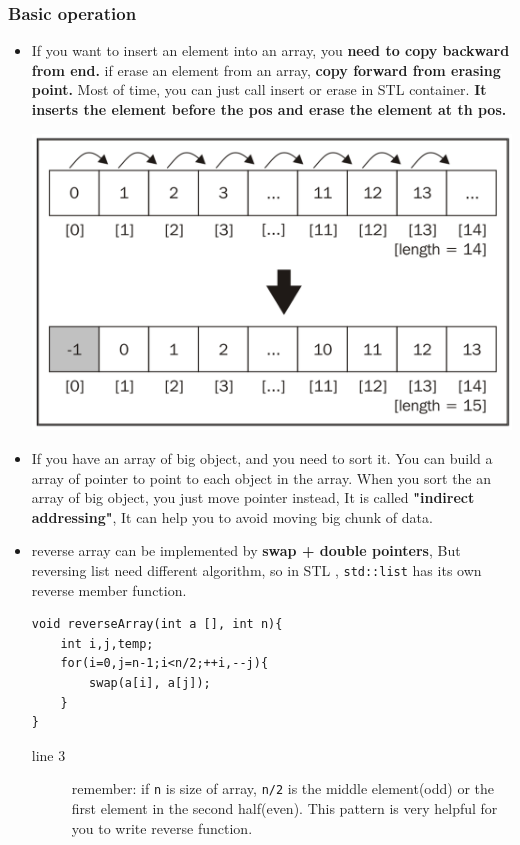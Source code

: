 \documentclass[a4paper,11pt,twoside]{book}
\begin{document}
\subsubsection{Basic operation}

\begin{itemize}
	\item If you want to insert an element into an array, you  \textbf{need to copy backward from end. }
if erase an element from an array, \textbf{copy forward from erasing point.} Most of time, you can just call insert or erase in STL container. \textbf{It inserts the element before the pos and erase the element at th pos.}

\includegraphics[scale=0.35]{pics/array_insert.png} \newline

	\item If you have an array of big object, and you need to sort it. You can build a array of pointer to point to each object in the array. When you sort the an array of big object,  you just move pointer instead, It is called \textbf{"indirect addressing"}, It can help you to avoid moving big chunk of data.  

	\item reverse array can be implemented by \textbf{swap + double pointers}, But reversing list need different algorithm, so in STL , \texttt{std::list} has its own reverse member function. 
\begin{lstlisting}[breaklines]
void reverseArray(int a [], int n){
	int i,j,temp;
	for(i=0,j=n-1;i<n/2;++i,--j){
		swap(a[i], a[j]);
	}
}
\end{lstlisting}
\begin{description}
	\item[line 3] remember: if \texttt{n} is size of array, \texttt{n/2} is the middle element(odd) or the first element in the second half(even). This pattern is very helpful for you to write reverse function. 
\end{description}


\end{itemize}
\end{document}
